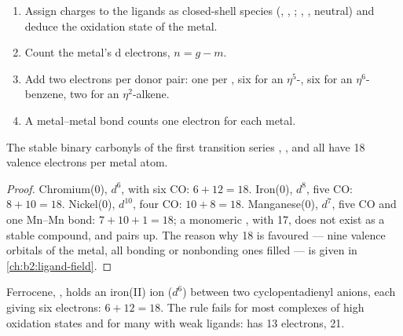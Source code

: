 \begin{method}\label{met:b2:coordination-complexes:electron-count}
\begin{enumerate}
  \item Assign charges to the ligands as closed-shell species (, ,
        ; , ,  neutral) and deduce the oxidation
        state of the metal.
  \item Count the metal's d electrons, $n = g - m$.
  \item Add two electrons per donor pair: one per , six for an
        $\eta^5$-, six for an $\eta^6$-benzene, two for an $\eta^2$-alkene.
  \item A metal--metal bond counts one electron for each metal.
\end{enumerate}
\end{method}

\begin{proposition}\label{prop:b2:coordination-complexes:eighteen}
The stable binary carbonyls of the first transition series ,
,  and  all have 18 valence electrons per metal
atom.
\end{proposition}

\begin{proof}
Chromium(0), $d^6$, with six CO: $6 + 12 = 18$. Iron(0), $d^8$, five CO: $8 + 10 = 18$.
Nickel(0), $d^{10}$, four CO: $10 + 8 = 18$. Manganese(0), $d^7$, five CO and one
Mn--Mn bond: $7 + 10 + 1 = 18$; a monomeric , with 17, does not exist as a
stable compound, and pairs up. The reason why 18 is favoured --- nine valence orbitals
of the metal, all bonding or nonbonding ones filled --- is given in
\cref{ch:b2:ligand-field}.
\end{proof}

Ferrocene, , holds an iron(II) ion ($d^6$) between two
cyclopentadienyl anions, each giving six electrons: $6 + 12 = 18$. The rule fails for
most complexes of high oxidation states and for many with weak ligands: 
has 13 electrons,  21.

